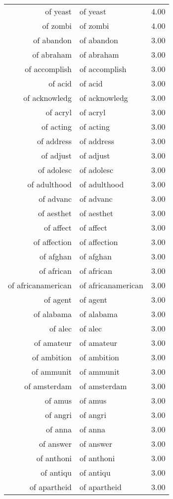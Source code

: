 \begin{table}[ht]
\begin{tabular}{rlr}
  of yeast & of yeast & 4.00 \\ 
  of zombi & of zombi & 4.00 \\ 
  of abandon & of abandon & 3.00 \\ 
  of abraham & of abraham & 3.00 \\ 
  of accomplish & of accomplish & 3.00 \\ 
  of acid & of acid & 3.00 \\ 
  of acknowledg & of acknowledg & 3.00 \\ 
  of acryl & of acryl & 3.00 \\ 
  of acting & of acting & 3.00 \\ 
  of address & of address & 3.00 \\ 
  of adjust & of adjust & 3.00 \\ 
  of adolesc & of adolesc & 3.00 \\ 
  of adulthood & of adulthood & 3.00 \\ 
  of advanc & of advanc & 3.00 \\ 
  of aesthet & of aesthet & 3.00 \\ 
  of affect & of affect & 3.00 \\ 
  of affection & of affection & 3.00 \\ 
  of afghan & of afghan & 3.00 \\ 
  of african & of african & 3.00 \\ 
  of africanamerican & of africanamerican & 3.00 \\ 
  of agent & of agent & 3.00 \\ 
  of alabama & of alabama & 3.00 \\ 
  of alec & of alec & 3.00 \\ 
  of amateur & of amateur & 3.00 \\ 
  of ambition & of ambition & 3.00 \\ 
  of ammunit & of ammunit & 3.00 \\ 
  of amsterdam & of amsterdam & 3.00 \\ 
  of amus & of amus & 3.00 \\ 
  of angri & of angri & 3.00 \\ 
  of anna & of anna & 3.00 \\ 
  of answer & of answer & 3.00 \\ 
  of anthoni & of anthoni & 3.00 \\ 
  of antiqu & of antiqu & 3.00 \\ 
  of apartheid & of apartheid & 3.00 \\ 

\end{tabular}
\end{table}
